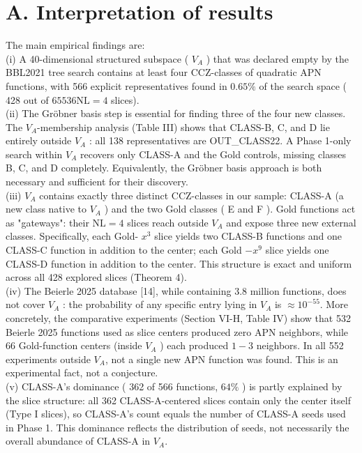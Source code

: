 \documentclass[10pt]{article}
\begin{document}
\section*{A. Interpretation of results}
The main empirical findings are:\\
(i) A 40-dimensional structured subspace ( $V_{A}$ ) that was declared empty by the BBL2021 tree search contains at least four CCZ-classes of quadratic APN functions, with 566 explicit representatives found in $0.65 \%$ of the search space ( 428 out of $65536 \mathrm{NL}=4$ slices).\\
(ii) The Gröbner basis step is essential for finding three of the four new classes. The $V_{A}$-membership analysis (Table III) shows that CLASS-B, C, and D lie entirely outside $V_{A}$ : all 138 representatives are OUT\_CLASS22. A Phase 1-only search within $V_{A}$ recovers only CLASS-A and the Gold controls, missing classes B, C, and D completely. Equivalently, the Gröbner basis approach is both necessary and sufficient for their discovery.\\
(iii) $V_{A}$ contains exactly three distinct CCZ-classes in our sample: CLASS-A (a new class native to $V_{A}$ ) and the two Gold classes ( E and F ). Gold functions act as "gateways": their $\mathrm{NL}=4$ slices reach outside $V_{A}$ and expose three new external classes. Specifically, each Gold- $x^{3}$ slice yields two CLASS-B functions and one CLASS-C function in addition to the center; each Gold $-x^{9}$ slice yields one CLASS-D function in addition to the center. This structure is exact and uniform across all 428 explored slices (Theorem 4).\\[0pt]
(iv) The Beierle 2025 database [14], while containing 3.8 million functions, does not cover $V_{A}$ : the probability of any specific entry lying in $V_{A}$ is $\approx 10^{-55}$. More concretely, the comparative experiments (Section VI-H, Table IV) show that 532 Beierle 2025 functions used as slice centers produced zero APN neighbors, while 66 Gold-function centers (inside $V_{A}$ ) each produced $1-3$ neighbors. In all 552 experiments outside $V_{A}$, not a single new APN function was found. This is an experimental fact, not a conjecture.\\
(v) CLASS-A's dominance ( 362 of 566 functions, $64 \%$ ) is partly explained by the slice structure: all 362 CLASS-A-centered slices contain only the center itself (Type I slices), so CLASS-A's count equals the number of CLASS-A seeds used in Phase 1. This dominance reflects the distribution of seeds, not necessarily the overall abundance of CLASS-A in $V_{A}$.\\
\end{document}
